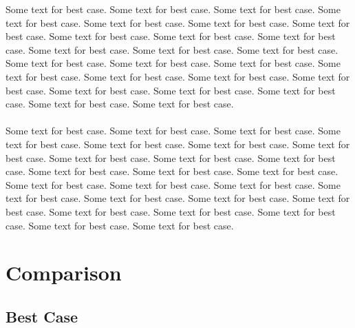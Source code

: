 \documentclass[10pt]{article}
\begin{document}
\indent \indent Some text for best case. Some text for best case. Some text for best case. Some text for best case. Some text for best case. Some text for best case. Some text for best case. Some text for best case. Some text for best case. Some text for best case. Some text for best case. Some text for best case. Some text for best case. Some text for best case. Some text for best case. Some text for best case. Some text for best case. Some text for best case. Some text for best case. Some text for best case. Some text for best case. Some text for best case. Some text for best case. Some text for best case. Some text for best case.  
\\\\
\indent Some text for best case. Some text for best case. Some text for best case. Some text for best case. Some text for best case. Some text for best case. Some text for best case. Some text for best case. Some text for best case. Some text for best case. Some text for best case. Some text for best case. Some text for best case. Some text for best case. Some text for best case. Some text for best case. Some text for best case. Some text for best case. Some text for best case. Some text for best case. Some text for best case. Some text for best case. Some text for best case. Some text for best case. Some text for best case.   


\section{Comparison}
\subsection{Best Case}
\begin{center}
\end{center}
\end{document}
